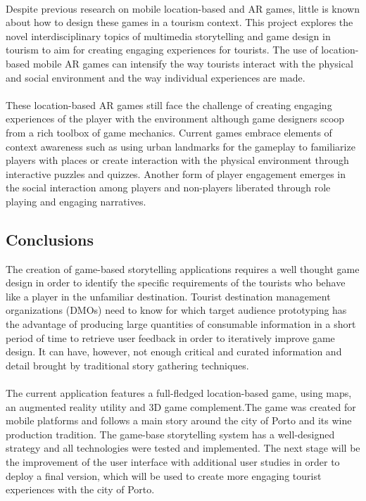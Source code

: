\paragraph{}Despite previous research on mobile location-based and AR games, little is known about how to design these games in a tourism context. This project explores the novel interdisciplinary topics of multimedia storytelling and game design in tourism to aim for creating engaging experiences for tourists. The use of location-based mobile AR games can intensify the way tourists interact with the physical and social environment and the way individual experiences are made.
\paragraph{}These location-based AR games still face the challenge of creating engaging experiences of the player with the environment although game designers scoop from a rich toolbox of game mechanics. Current games embrace elements of context awareness such as using urban landmarks for the gameplay to familiarize players with places or create interaction with the physical environment through interactive puzzles and quizzes. Another form of player engagement emerges in the social interaction among players and non-players liberated through role playing and engaging narratives.
\subsection{Conclusions}
The creation of game-based storytelling applications requires a well thought game design in order to identify the speciﬁc requirements of the tourists who behave like a player in the unfamiliar destination. Tourist destination management organizations (DMOs) need to know for which target audience prototyping has the advantage of producing large quantities of consumable information in a short period of time to retrieve user feedback in order to iteratively improve game design. It can have, however, not enough critical and curated information and detail brought by traditional story gathering techniques. 
\paragraph{}The current application features a full-ﬂedged location-based game, using maps, an augmented reality utility and 3D game complement.The game was created for mobile platforms and follows a main story around the city of Porto and its wine production tradition. The game-base storytelling system has a well-designed strategy and all technologies were tested and implemented. The next stage will be the improvement of the user interface with additional user studies in order to deploy a ﬁnal version, which will be used to create more engaging tourist experiences with the city of Porto.
